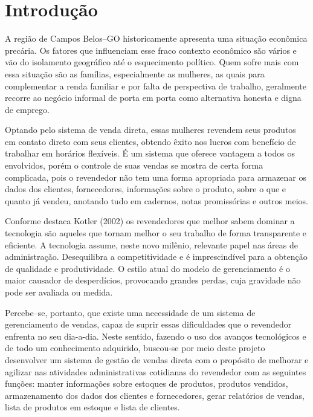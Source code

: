 \documentclass[chapter=TITLE,12pt,oneside,a4paper,english,french,sumario=tradicional,spanish,brazil,]{abntex2}
\begin{document}
\begin{SingleSpace}
\tableofcontents*%
\thispagestyle{empty}
\end{SingleSpace}
\textual %
\setcounter{page}{7}  %
\chapter*{Introdução}
A região de Campos Belos–GO historicamente apresenta uma situação econômica precária. Os fatores que influenciam esse fraco contexto econômico são vários e vão do isolamento geográfico até o esquecimento político. Quem sofre mais com essa situação são as famílias, especialmente as mulheres, as quais para complementar a renda familiar e por falta de perspectiva de trabalho, geralmente recorre ao negócio informal de porta em porta como alternativa honesta e digna de emprego.

Optando pelo sistema de venda direta, essas mulheres revendem seus produtos em contato direto com seus clientes, obtendo êxito nos lucros com benefício de trabalhar em horários flexíveis. É um sistema que oferece vantagem a todos os envolvidos, porém o controle de suas vendas se mostra de certa forma complicada, pois o revendedor não tem uma forma apropriada para armazenar os dados dos clientes, fornecedores, informações sobre o produto, sobre o que e quanto já vendeu, anotando tudo em cadernos, notas promissórias e outros meios.

Conforme destaca Kotler (2002) os revendedores que melhor sabem dominar a tecnologia são aqueles que tornam melhor o seu trabalho de forma transparente e eficiente. A tecnologia assume, neste novo milênio, relevante papel nas áreas de administração. Desequilibra a competitividade e é imprescindível para a obtenção de qualidade e produtividade. O estilo atual do modelo de gerenciamento é o maior causador de desperdícios, provocando grandes perdas, cuja gravidade não pode ser avaliada ou medida.

Percebe–se, portanto, que existe uma necessidade de um sistema de gerenciamento de vendas, capaz de suprir essas dificuldades que o revendedor enfrenta no seu dia-a-dia. Neste sentido, fazendo o uso dos avanços tecnológicos e de todo um conhecimento adquirido, buscou-se por meio deste projeto desenvolver um sistema de gestão de vendas direta com o propósito de melhorar e agilizar nas atividades administrativas cotidianas do revendedor com as seguintes funções: manter informações sobre estoques de produtos, produtos vendidos, armazenamento dos dados dos clientes e fornecedores, gerar relatórios de vendas, lista de produtos em estoque e lista de clientes.
\end{document}
